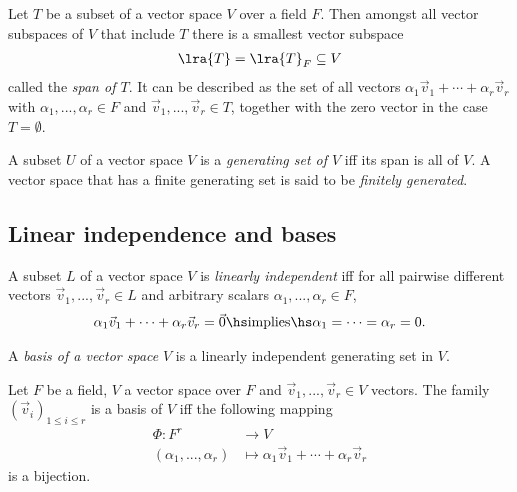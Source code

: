 \documentclass{article}
\begin{document}
\begin{proposition}[Proposition 1.4.5]
	Let $T$ be a subset of a vector space $V$ over a field $F$. Then amongst all
	vector subspaces of $V$ that include $T$ there is a smallest vector subspace
	\begin{align*}
		\lra{T} = \lra{T}_F\subseteq V
	\end{align*}
	called the \emph{span of $T$}.
	It can be described as the set of all vectors $\alpha_1\vec v_1+\cdots+\alpha_r\vec v_r$
	with $\alpha_1,...,\alpha_r\in F$ and $\vec v_1,...,\vec v_r\in T$, together
	with the zero vector in the case $T=\emptyset$.
\end{proposition}

\begin{definition}
	A subset $U$ of a vector space $V$ is a \emph{generating set of $V$}
	iff its span is all of $V$. A vector space that has a finite generating set
	is said to be \emph{finitely generated}.
\end{definition}

\subsection{Linear independence and bases}

\begin{definition}
	A subset $L$ of a vector space $V$ is \emph{linearly independent}
	iff for all pairwise different vectors $\vec v_1,...,\vec v_r\in L$ and
	arbitrary scalars $\alpha_1,...,\alpha_r\in F$,
	\begin{align*}
		\alpha_1\vec v_1+\cdots+\alpha_r\vec v_r = \vec 0
		\hs\text{implies}\hs
		\alpha_1=\cdots=\alpha_r=0.
	\end{align*}
\end{definition}

\begin{definition}
	A \emph{basis of a vector space} $V$ is a linearly independent generating
	set in $V$.
\end{definition}

\begin{theorem}[Theorem 1.5.11]
	Let $F$ be a field, $V$ a vector space over $F$ and $\vec v_1,...,\vec v_r\in V$
	vectors. The family $\left(\vec v_i\right)_{1\leq i\leq r}$ is a basis of $V$
	iff the following mapping
	\begin{align*}
		\Phi:F^r                & \to V                                                \\
		(\alpha_1,...,\alpha_r) & \mapsto \alpha_1\vec v_1 + \cdots + \alpha_r\vec v_r
	\end{align*}
	is a bijection.
\end{theorem}
\end{document}
